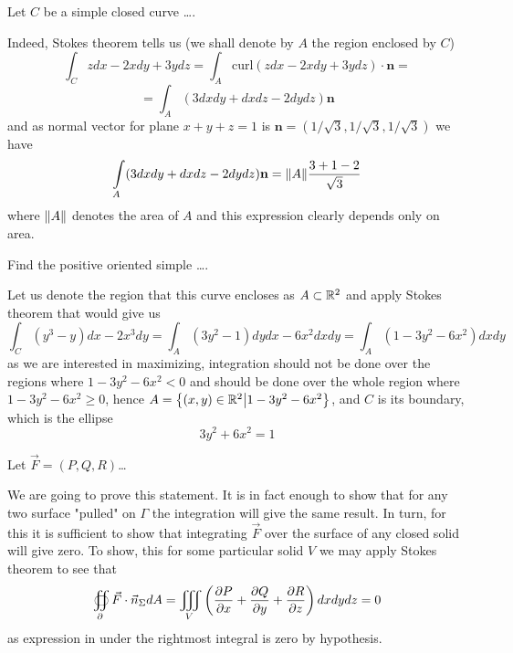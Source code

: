 \documentclass[10pt]{article} %
\title{}
\author{}
\begin{document}
\maketitle
\begin{myprob}
	Let $C$ be a simple closed curve \dots.
\end{myprob}
Indeed, Stokes theorem tells us (we shall denote by $A$ the region enclosed by $C$)
\[\int_Czdx-2xdy+3ydz=\int_A\mbox{curl}(zdx-2xdy+3ydz)\cdot\mathbf{n}=\]
\[=\int_A(3dxdy+dxdz-2dydz)\mathbf{n}\]
and as normal vector for plane $x+y+z=1$ is $\mathbf{n}=(1/\sqrt{3},1/\sqrt{3},1/\sqrt{3})$ we have
\[\int_A(3dxdy+dxdz-2dydz)\mathbf{n}=\mynorm{A}\frac{3+1-2}{\sqrt{3}}\]
where $\|A\|$ denotes the area of $A$ and this expression clearly depends only on area.

\begin{myprob}
	Find the positive oriented simple \dots.
\end{myprob}
Let us denote the region that this curve encloses as $A\subset\mathbb{R}^2$ and apply Stokes theorem that would give us
\[\int_C(y^3-y)dx-2x^3dy=\int_A(3y^2-1)dydx-6x^2dxdy=\int_A(1-3y^2-6x^2)dxdy\]
as we are interested in maximizing, integration should not be done over the regions where $1-3y^2-6x^2<0$ and should be done over
the whole region where $1-3y^2-6x^2\geq0$, hence $A=\left\{(x,y)\in\mathbb{R}^2\big| 1-3y^2-6x^2\right\}$, and $C$ is its boundary, which is the ellipse
\[3y^2+6x^2=1\]
\begin{myprob}
	Let $\vec{F}=(P,Q,R)$\dots
\end{myprob}
We are going to prove this statement. It is in fact enough to show that for any two surface "pulled" on $\Gamma$ the integration
will give the same result. In turn, for this it is sufficient to show that integrating $\vec{F}$ over the surface of any closed solid
will give zero. To show, this for some particular solid $V$ we may apply Stokes theorem to see that
\[\oiint_\partial \vec{F}\cdot\vec{n}_{\Sigma}dA=\iiint_V\left(\frac{\partial P}{\partial x}+\frac{\partial Q}{\partial y}+\frac{\partial R}
{\partial z}\right)dxdydz=0\]
as expression in under the rightmost integral is zero by hypothesis.
\end{document}

